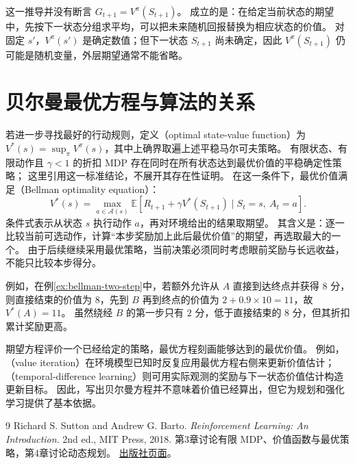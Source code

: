 \documentclass[UTF8]{ctexart}
\begin{document}
这一推导并没有断言 $G_{t+1}=V^\pi(S_{t+1})$。
成立的是：在给定当前状态的期望中，先按下一状态分组求平均，可以把未来随机回报替换为相应状态的价值。
对固定 $s'$，$V^\pi(s')$ 是确定数值；但下一状态 $S_{t+1}$ 尚未确定，因此 $V^\pi(S_{t+1})$ 仍可能是随机变量，外层期望通常不能省略。

\section{贝尔曼最优方程与算法的关系}
\label{sec:bellman-optimality}

若进一步寻找最好的行动规则，定义（optimal state-value function）为
$V^*(s)=\sup_\pi V^\pi(s)$，其中上确界取遍上述平稳马尔可夫策略。
有限状态、有限动作且 $\gamma<1$ 的折扣 MDP 存在同时在所有状态达到最优价值的平稳确定性策略；
这里引用这一标准结论\cite[第3章]{sutton-barto}，不展开其存在性证明。
在这一条件下，最优价值满足（Bellman optimality equation）：
\begin{equation}
  \boxed{
  V^*(s)=\max_{a\in\mathcal A(s)}
  \mathbb E\!\left[
    R_{t+1}+\gamma V^*(S_{t+1})\mid S_t=s,\ A_t=a
  \right].}
  \label{eq:bellman-optimality}
\end{equation}
条件式表示从状态 $s$ 执行动作 $a$，再对环境给出的结果取期望。
其含义是：逐一比较当前可选动作，计算“本步奖励加上此后最优价值”的期望，再选取最大的一个。
由于后续继续采用最优策略，当前决策必须同时考虑眼前奖励与长远收益，不能只比较本步得分。

例如，在例\ref{ex:bellman-two-step}中，若额外允许从 $A$ 直接到达终点并获得 $8$ 分，
则直接结束的价值为 $8$，先到 $B$ 再到终点的价值为 $2+0.9\times10=11$，故 $V^*(A)=11$。
虽然绕经 $B$ 的第一步只有 $2$ 分，低于直接结束的 $8$ 分，但其折扣累计奖励更高。

期望方程评价一个已经给定的策略，最优方程刻画能够达到的最优价值。
例如，（value iteration）在环境模型已知时反复应用最优方程右侧来更新价值估计；
（temporal-difference learning）则可用实际观测的奖励与下一状态价值估计构造更新目标。
因此，写出贝尔曼方程并不意味着价值已经算出，但它为规划和强化学习提供了基本依据。

\begin{thebibliography}{9}
Richard S. Sutton and Andrew G. Barto.
\emph{Reinforcement Learning: An Introduction}.
2nd ed., MIT Press, 2018.
第3章讨论有限 MDP、价值函数与最优策略，第4章讨论动态规划。
\href{https://mitpress.mit.edu/9780262039246/reinforcement-learning/}{出版社页面}。
\end{thebibliography}
\end{document}
